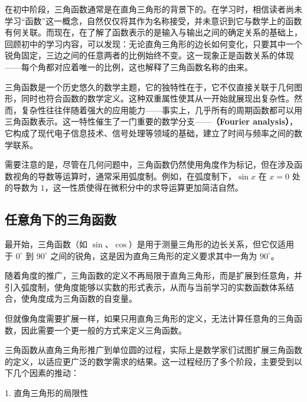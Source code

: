 \begin{issues}
\issueDraft
\end{issues}

在初中阶段，三角函数通常是在直角三角形的背景下的。在学习时，相信读者尚未学习“函数”这一概念，自然仅仅将其作为名称接受，并未意识到它与数学上的函数有何关联。而现在，在了解了函数表示的是输入与输出之间的确定关系的基础上，回顾初中的学习内容，可以发现：无论直角三角形的边长如何变化，只要其中一个锐角固定，三边之间的任意两者的比例始终不变。这一现象正是函数关系的体现——每个角都对应着唯一的比例，这也解释了三角函数名称的由来。

三角函数是一个历史悠久的数学主题，它的独特性在于，它不仅直接关联于几何图形，同时也符合函数的数学定义。这种双重属性使其从一开始就展现出复杂性。然而，复杂性往往伴随着强大的应用能力——事实上，几乎所有的周期函数都可以用三角函数表示。这一特性催生了一门重要的数学分支——\textbf{（Fourier analysis）}，它构成了现代电子信息技术、信号处理等领域的基础，建立了时间与频率之间的数学联系。

需要注意的是，尽管在几何问题中，三角函数仍然使用角度作为标记，但在涉及函数视角的导数等运算时，通常采用弧度制。例如，在弧度制下，$\sin x$ 在 $x=0$ 处的导数为 $1$，这一性质使得在微积分中的求导运算更加简洁自然。

\subsection{任意角下的三角函数}

最开始，三角函数（如 $\sin$、$\cos$）是用于测量三角形的边长关系，但它仅适用于 $0^\circ$ 到 $90^\circ$ 之间的锐角，这是因为直角三角形的定义要求其中一角为 $90^\circ$。

随着角度的推广，三角函数的定义不再局限于直角三角形，而是扩展到任意角，并引入弧度制，使角度能够以实数的形式表示，从而与当前学习的实数函数体系结合，使角度成为三角函数的自变量。

但就像角度需要扩展一样，如果只用直角三角形的定义，无法计算任意角的三角函数，因此需要一个更一般的方式来定义三角函数。

三角函数从直角三角形推广到单位圆的过程，实际上是数学家们试图扩展三角函数的定义，以适应更广泛的数学需求的结果。这一过程经历了多个阶段，主要受到以下几个因素的推动：

1. 直角三角形的局限性

